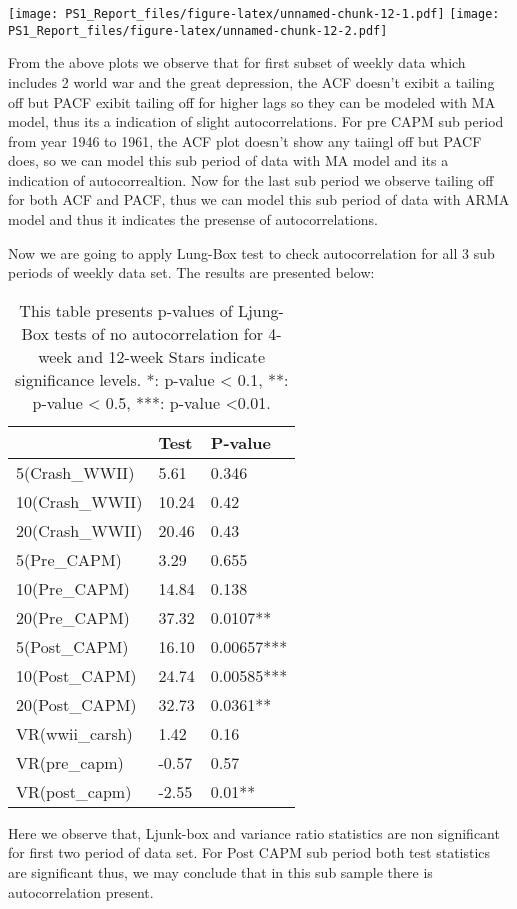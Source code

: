 \documentclass[
]{article}
\begin{document}
\texttt{[image: PS1\_Report\_files/figure-latex/unnamed-chunk-12-1.pdf]}
\texttt{[image: PS1\_Report\_files/figure-latex/unnamed-chunk-12-2.pdf]}

From the above plots we observe that for first subset of weekly data
which includes 2 world war and the great depression, the ACF doesn't
exibit a tailing off but PACF exibit tailing off for higher lags so they
can be modeled with MA model, thus its a indication of slight
autocorrelations. For pre CAPM sub period from year 1946 to 1961, the
ACF plot doesn't show any taiingl off but PACF does, so we can model
this sub period of data with MA model and its a indication of
autocorrealtion. Now for the last sub period we observe tailing off for
both ACF and PACF, thus we can model this sub period of data with ARMA
model and thus it indicates the presense of autocorrelations.

Now we are going to apply Lung-Box test to check autocorrelation for all
3 sub periods of weekly data set. The results are presented below:

\begin{table}

\caption{\label{tab:unnamed-chunk-13}This table presents p-values of Ljung-Box tests of no autocorrelation for 4-week and 12-week Stars indicate significance levels. *: p-value < 0.1, **: p-value < 0.5, ***: p-value <0.01.}
\centering
\begin{tabular}[t]{l|l|l}
\hline
  & Test & P-value\\
\hline
5(Crash\_WWII) & 5.61 & 0.346\\
\hline
10(Crash\_WWII) & 10.24 & 0.42\\
\hline
20(Crash\_WWII) & 20.46 & 0.43\\
\hline
5(Pre\_CAPM) & 3.29 & 0.655\\
\hline
10(Pre\_CAPM) & 14.84 & 0.138\\
\hline
20(Pre\_CAPM) & 37.32 & 0.0107**\\
\hline
5(Post\_CAPM) & 16.10 & 0.00657***\\
\hline
10(Post\_CAPM) & 24.74 & 0.00585***\\
\hline
20(Post\_CAPM) & 32.73 & 0.0361**\\
\hline
VR(wwii\_carsh) & 1.42 & 0.16\\
\hline
VR(pre\_capm) & -0.57 & 0.57\\
\hline
VR(post\_capm) & -2.55 & 0.01**\\
\hline
\end{tabular}
\end{table}

Here we observe that, Ljunk-box and variance ratio statistics are non
significant for first two period of data set. For Post CAPM sub period
both test statistics are significant thus, we may conclude that in this
sub sample there is autocorrelation present.
\end{document}
